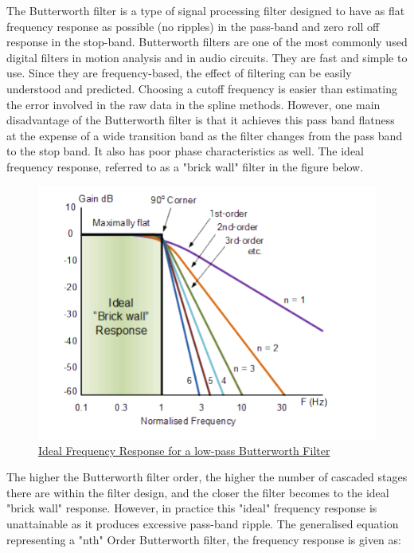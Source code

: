 The Butterworth filter is a type of signal processing filter designed to have as flat frequency
response as possible (no ripples) in the pass-band and zero roll off response in the stop-band.
Butterworth filters are one of the most commonly used digital filters in motion analysis and in
audio circuits. They are fast and simple to use. Since they are frequency-based, the effect of
filtering can be easily understood and predicted. Choosing a cutoff frequency is easier
than estimating the error involved in the raw data in the spline methods. However, one main
disadvantage of the Butterworth filter is that it achieves this pass band flatness at the expense
of a wide transition band as the filter changes from the pass band to the stop band. It also has
poor phase characteristics as well. The ideal frequency response, referred to as a "brick wall"
filter in the figure below.

\begin{figure}[h]
	\centering
	\includegraphics[width=1\textwidth]{figures/Implementation/butterworth.png}
	\captionsetup{labelformat=empty}
	\caption{\href{https://www.electronics-tutorials.ws/wp-content/uploads/2018/05/filter-fil57.gif}
	{Ideal Frequency Response for a low-pass Butterworth Filter}}
\end{figure}

The higher the Butterworth filter order, the higher the number of cascaded stages
there are within the filter design, and the closer the filter becomes to the ideal "brick wall"
response. However, in practice this "ideal" frequency response is unattainable as it produces
excessive pass-band ripple. The generalised equation representing a "nth" Order Butterworth filter, the frequency response is given as:

